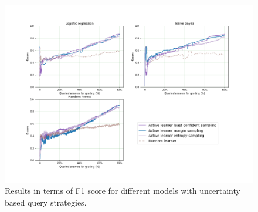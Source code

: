 \begin{figure}[!htb]
	\centering
	\includegraphics[scale=0.45]{images/task3_f1score_uncertainty}
	\caption{Results in terms of F1 score for different models with uncertainty based query strategies.}
	\label{t3_m_uncertainty_f1}
\end{figure}


